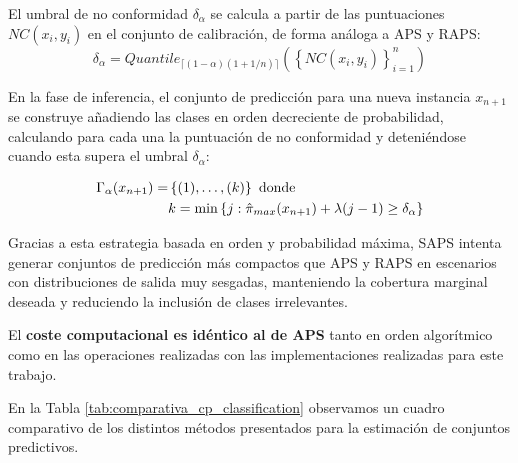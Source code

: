 El umbral de no conformidad $\delta_\alpha$ se calcula a partir de las puntuaciones $NC(x_i, y_i)$ en el conjunto de calibración, de forma análoga a \acrshort{APS} y \acrshort{RAPS}:
$$
\delta_\alpha = Quantile_{\lceil (1-\alpha)(1+1/n) \rceil} \left( \left\{ NC(x_i, y_i) \right\}_{i=1}^n \right)
$$

En la fase de inferencia, el conjunto de predicción para una nueva instancia $x_{n+1}$ se construye añadiendo las clases en orden decreciente de probabilidad, calculando para cada una la puntuación de no conformidad y deteniéndose cuando esta supera el umbral $\delta_\alpha$:

\begin{align*}
\Gamma_\alpha(x_{n+1}) = &\left\{ (1), \dots, (k) \right\} \ \textnormal{donde} \\
& k = \min \left\{ j : \hat{\pi}_{max}(x_{n+1}) + \lambda (j - 1) \ge \delta_\alpha \right\}
\end{align*}

Gracias a esta estrategia basada en orden y probabilidad máxima, \acrshort{SAPS} intenta generar conjuntos de predicción más compactos que \acrshort{APS} y \acrshort{RAPS} en escenarios con distribuciones de salida muy sesgadas, manteniendo la cobertura marginal deseada y reduciendo la inclusión de clases irrelevantes.

El \textbf{coste computacional es idéntico al de \acrshort{APS}} tanto en orden algorítmico como en las operaciones realizadas con las implementaciones realizadas para este trabajo.


En la Tabla \ref{tab:comparativa_cp_classification} observamos un cuadro comparativo de los distintos métodos presentados para la estimación de conjuntos predictivos. 

